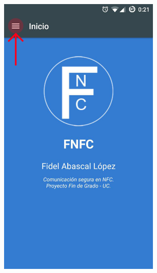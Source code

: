 \documentclass[../PFC.tex]{subfiles}
\begin{document}
\begin{figure}[H]
\centering
	\begin{subfigure}{0.4\textwidth}
		\centering
		\includegraphics[width=0.85\textwidth]{./img/app/accesoMenu}
    \end{subfigure}          
    \qquad\qquad\qquad  %
    \begin{subfigure}{0.4\textwidth}  
       \centering

\end{subfigure}
\end{figure}
\end{document}
